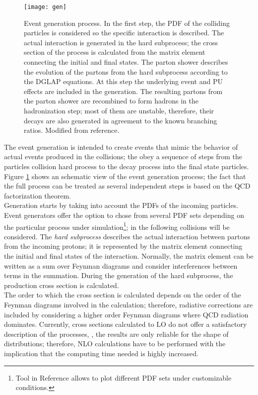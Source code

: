 \begin{figure}[!h]
  \centering
  \texttt{[image: gen]}
  \caption[Event generation process.]{Event generation process. In the first step, the PDF of the colliding particles is considered so the specific interaction is described. The actual interaction is generated in the hard subprocess; the cross section of the process is calculated from the matrix element connecting the initial and final states. The parton shower describes the evolution of the partons from the hard subprocess according to the DGLAP equations. At this step the underlying event and PU effects are included in the generation. The resulting partons from the parton shower are recombined to form hadrons in the hadronization step; most of them are unstable, therefore, their decays are also generated in agreement to the known branching ratios. Modified from reference\cite{gen_scheme}.}\label{fig:gen}
\end{figure}

\noindent The event generation is intended to create events that mimic the behavior of actual events produced in the collisions; the obey a sequence of steps from the particles collision hard process to the decay process into the final state particles. Figure \ref{fig:gen} shows an schematic view of the event generation process; the fact that the full process can be treated as several independent steps is based on the QCD factorization theorem.\\     

\noindent Generation starts by taking into account the PDFs of the incoming particles. Event generators offer the option to chose from several PDF sets depending on the particular process under simulation\footnote{Tool in Reference \cite{pdfplot} allows to plot different PDF sets under customizable conditions.}; in the following \pp collisions will be considered. The \textit{hard subprocess} describes the actual interaction between partons from the incoming protons; it is represented by the matrix element connecting the initial and final states of the interaction. Normally, the matrix element can be written as a sum over Feynman diagrams and consider interferences between terms in the summation. During the generation of the hard subprocess, the production cross section is calculated.\\ 

\noindent The order to which the cross section is calculated depends on the order of the Feynman diagrams involved in the calculation; therefore, radiative corrections are included by considering a higher order Feynman diagrams where QCD radiation dominates. Currently, cross sections calculated to LO do not offer a satisfactory description of the processes, \ie, the results are only reliable for the shape of distributions; therefore, NLO calculations have to be performed with the implication that the computing time needed is highly increased.\\       

